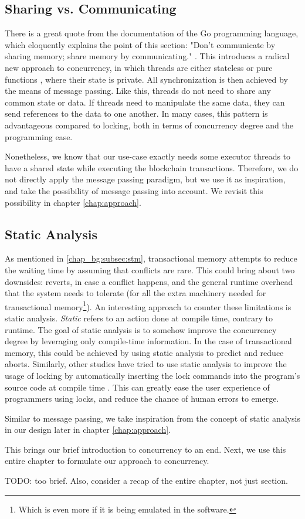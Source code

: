 \subsection{Sharing vs. Communicating}\label{chap_bg:subsec:sharing_communication}

There is a great quote from the documentation of the Go programming language, which eloquently
explains the point of this section: "Don't communicate by sharing memory; share memory by
communicating." \cite{ShareMemoryCommunicating}. This introduces a radical new approach to
concurrency, in which threads are either stateless or pure functions
\cite{MostlyAdequateMostlyadequateguide}, where their state is private. All synchronization is then
achieved by the means of message passing. Like this, threads do not need to share any common state
or data. If threads need to manipulate the same data, they can send references to the data to one
another. In many cases, this pattern is advantageous compared to locking, both in terms of
concurrency degree and the programming ease.

Nonetheless, we know that our use-case exactly needs some executor threads to have a
shared state while executing the blockchain transactions. Therefore, we do not directly apply the message passing
paradigm, but we use it as inspiration, and take the possibility of message passing into account. We
revisit this possibility in chapter \ref{chap:approach}.

\subsection{Static Analysis}

As mentioned in \ref{chap_bg:subsec:stm}, transactional memory attempts to reduce the waiting time
by assuming that conflicts are rare. This could bring about two downsides: reverts, in case a
conflict happens, and the general runtime overhead that the system needs to tolerate (for all the
extra machinery needed for transactional memory\footnote{Which is even more if it is being emulated
in the software.}). An interesting approach to counter these limitations is static analysis. \textit{Static} refers to an action done at compile time, contrary to runtime. The goal of static
analysis is to somehow improve the concurrency degree by leveraging only compile-time information.
In the case of transactional memory, this could be achieved by using static analysis to predict and
reduce aborts\cite{diasEfficientCorrectTransactional}. Similarly, other studies have tried to use
static analysis to improve the usage of locking by automatically inserting the lock commands into
the program's source code at compile time \cite{cheremInferringLocksAtomic2007}. This can greatly
ease the user experience of programmers using locks, and reduce the chance of human errors to emerge.

Similar to message passing, we take inspiration from the concept of static analysis in our design
later in chapter \ref{chap:approach}.

This brings our brief introduction to concurrency to an end. Next, we use this entire chapter
to formulate our approach to concurrency.

TODO: too brief. Also, consider a recap of the entire chapter, not just section.
